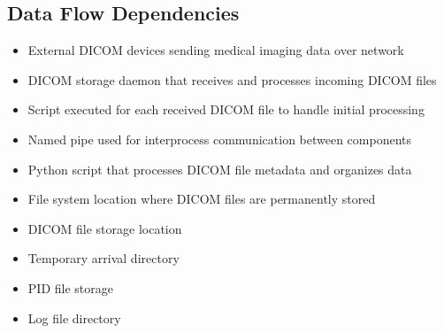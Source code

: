 \documentclass[letterpaper,10pt,english]{sphinxmanual}
\begin{document}
\subsection{Data Flow Dependencies}
\label{\detokenize{Architecture/scripts/storectl:data-flow-dependencies}}



\sphinxAtStartPar
{}
\begin{itemize}
\item {} 
\sphinxAtStartPar
{} \sphinxhyphen{} External DICOM devices sending medical imaging data over network

\item {} 
\sphinxAtStartPar
{} \sphinxhyphen{} DICOM storage daemon that receives and processes incoming DICOM files

\item {} 
\sphinxAtStartPar
{} \sphinxhyphen{} Script executed for each received DICOM file to handle initial processing

\item {} 
\sphinxAtStartPar
{} \sphinxhyphen{} Named pipe used for inter\sphinxhyphen{}process communication between components

\item {} 
\sphinxAtStartPar
{} \sphinxhyphen{} Python script that processes DICOM file metadata and organizes data

\item {} 
\sphinxAtStartPar
{} \sphinxhyphen{} File system location where DICOM files are permanently stored

\end{itemize}

\sphinxAtStartPar
{}
\begin{itemize}
\item {} 
\sphinxAtStartPar
{} \sphinxhyphen{} DICOM file storage location

\item {} 
\sphinxAtStartPar
{} \sphinxhyphen{} Temporary arrival directory

\item {} 
\sphinxAtStartPar
{} \sphinxhyphen{} PID file storage

\item {} 
\sphinxAtStartPar
{} \sphinxhyphen{} Log file directory

\end{itemize}
\end{document}
